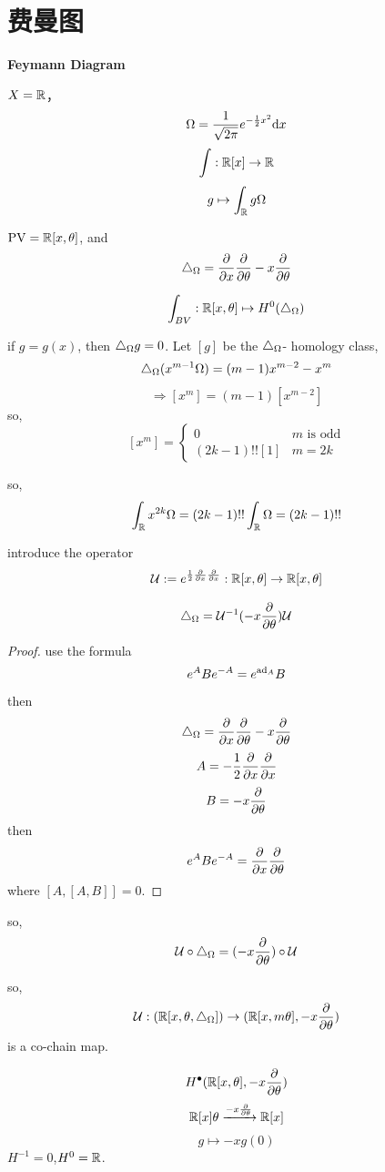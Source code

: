 
\section{费曼图}
\textbf{Feymann Diagram}
\begin{example}
$X=\mathbb{R}$，
$$\Omega=\frac{1}{\sqrt{2\pi}}e^{-\frac{1}{2}x^2}\mathrm{d} x$$
$$\int:\mathbb{R}[x]\to\mathbb{R}$$
$$g\mapsto\int_{\mathbb{R}}g\Omega$$

$\operatorname{PV}=\mathbb{R}[x,\theta]$, and
$$\triangle_{\Omega}=\frac{\partial } {\partial x}\frac{\partial } {\partial \theta}-x\frac{\partial } {\partial \theta}$$

$$\int_{BV}:\mathbb{R}[x,\theta]\mapsto H^0(\triangle_{\Omega})$$

if $g=g(x)$, then $\triangle_{\Omega}g=0$. Let $[g]$ be the
$\triangle_{\Omega}$- homology class,
$$\triangle_{\Omega}(x^{m-1}\Omega)
=(m-1)x^{m-2}
-x^m$$
$$\Rightarrow [x^m]=(m-1)[x^{m-2}]$$
so,
$$
[x^m]=
\left\{
  \begin{array}{cc}
    0  &  m \text{ is odd}\\
    (2k-1)!![1]  & m=2k
  \end{array}
\right.
$$

so,
$$\int_{\mathbb{R}}x^{2k}\Omega=
(2k-1)!!\int_{\mathbb{R}}\Omega=(2k-1)!!$$

\end{example}

introduce the operator
$$\mathcal{U}:=
  e^{\frac{1}{2}\frac{\partial } {\partial x}\frac{\partial } {\partial x}}:
  \mathbb{R}[x,\theta]\to\mathbb{R}[x,\theta]
$$

\begin{lemma}
$$\triangle_{\Omega}=\mathcal{U}^{-1}(-x\frac{\partial } {\partial \theta})\mathcal{U}$$
\end{lemma}
\begin{proof}
use the formula
$$e^ABe^{-A}=e^{\operatorname{ad}_A}B$$
then
$$\triangle_{\Omega}=\frac{\partial } {\partial x}\frac{\partial } {\partial \theta}-x\frac{\partial } {\partial \theta}
$$
$$A=-\frac{1}{2}\frac{\partial } {\partial x}\frac{\partial } {\partial x}$$
$$B=-x\frac{\partial } {\partial \theta}$$
then
$$e^ABe^{-A}=\frac{\partial } {\partial x}\frac{\partial } {\partial \theta}$$
where $[A,[A,B]]=0$.
\end{proof}

so,
$$\mathcal{U}\circ\triangle_{\Omega}=(-x\frac{\partial } {\partial \theta})\circ\mathcal{U}$$

so,
$$\mathcal{U}:(\mathbb{R}[x,\theta,\triangle_{\Omega}])\to
(\mathbb{R}[x,m\theta],-x\frac{\partial } {\partial \theta})$$
is a co-chain map.

$$H^{\bullet}(\mathbb{R}[x,\theta],-x\frac{\partial } {\partial \theta})$$
$$\mathbb{R}[x]\theta\xrightarrow{-x\frac{\partial } {\partial \theta}}\mathbb{R}[x]$$
$$g\mapsto -xg(0)$$
$H^{-1}=0$,$H^0=\mathbb{R}$.

